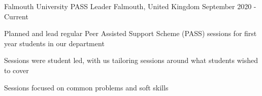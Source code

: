 

\begin{cventries}

  \cventry
    {Falmouth University} %
    {PASS Leader} %
    {Falmouth, United Kingdom} %
    {September 2020 - Current} %
    {
      \begin{cvitems} %
        \item Planned and lead regular Peer Assisted Support Scheme (PASS) sessions for first year students in our department
        \item Sessions were student led, with us tailoring sessions around what students wished to cover
        \item Sessions focused on common problems and soft skills
      \end{cvitems}
    }

\end{cventries}
